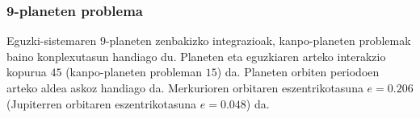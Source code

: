 \begin{table}[h]
\caption[Kanpoko planeten problemaren hasierako balioak]{Kanpo-planeten problemaren hasierako balioak, kokapenak ($x,y,z$) eta abiadurak ($v_x,v_y,v_z$)}
\label{tab:oss0}       %
\centering
{}
\end{table}


\subsubsection*{9-planeten problema}
\label{sss:9body}

Eguzki-sistemaren 9-planeten zenbakizko integrazioak, kanpo-planeten problemak baino konplexutasun handiago du. Planeten eta eguzkiaren arteko interakzio kopurua $45$ (kanpo-planeten probleman $15$) da. Planeten orbiten periodoen arteko aldea askoz handiago da. Merkurioren orbitaren eszentrikotasuna $e=0.206$ (Jupiterren orbitaren eszentrikotasuna $e=0.048$) da. 

